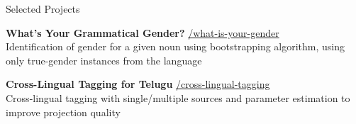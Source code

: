
\begin{rSection}{\faFolderOpen \hspace{0.5mm} Selected Projects}

    {\textbf{What's Your Grammatical Gender?}} \hfill {\href{https://github.com/Akshayanti/what-is-your-gender}{\faGithub/what-is-your-gender}}\\
        Identification of gender for a given noun using bootstrapping algorithm, using only true-gender instances from the language

    {\textbf{Cross-Lingual Tagging for Telugu}} \hfill
    \href{https://github.com/Akshayanti/cross-lingual-tagging}{\faGithub/cross-lingual-tagging}\\
        Cross-lingual tagging with single/multiple sources and parameter estimation to improve projection quality

\end{rSection}